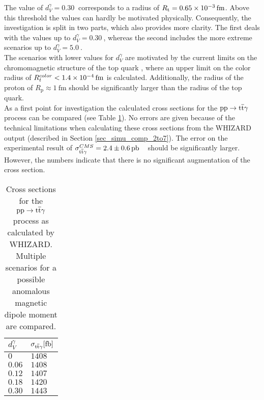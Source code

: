 The value of $d_V^{\gamma} = \SI{0.30}{}$ corresponds to a radius of $R_{\mathrm{t}} = \SI{0.65d-3}{\femto \meter}$. Above this threshold the values can hardly be motivated physically. Consequently, the investigation is split in two parts, which also provides more clarity. The first deals with the values up to $d_V^{\gamma} = \SI{0.30}{}$, whereas the second includes the more extreme scenarios up to $d_V^{\gamma} = \SI{5.0}{}$. \\
The scenarios with lower values for $d_V^{\gamma}$ are motivated by the current limits on the chromomagnetic structure of the top quark \cite{Englert:2012by}, where an upper limit on the color radius of $R_t^{color} < \SI{1.4d-4}{\femto \meter}$ is calculated. Additionally, the radius of the proton of $R_{\mathrm{p}} \approx \SI{1}{\femto \meter}$ should be significantly larger than the radius of the top quark. \\
As a first point for investigation the calculated cross sections for the $\mathrm{pp} \to \mathrm{t}\overline{\mathrm{t}} \gamma $ process can be compared (see Table \ref{tab_ano_crosssec}). No errors are given because of the technical limitations when calculating these cross sections from the WHIZARD output (described in Section \ref{sec_simu_comp_2to7}). The error on the experimental result of $\sigma^{CMS}_{\ttgamma} = \SI{2.4 \pm 0.6}{\pico \barn}$ ~\cite{CMS-PAS-TOP-13-011} should be significantly larger. However, the numbers indicate that there is no significant augmentation of the cross section. 

\begin{table}[ht]
\centering
    \caption{Cross sections for the $\mathrm{pp} \to \mathrm{t}\overline{\mathrm{t}} \gamma$ process as calculated by WHIZARD. Multiple scenarios for a possible anomalous magnetic dipole moment are compared.}
    \begin{tabular}{| l | l |}

    \hline
    $d_{V}^{\gamma}$ & $\sigma_{\ttgamma} [\SI{}{\femto \barn}]$ \\
    \hline
    $0$ &  $1408$\\
    \hline
    $0.06$ & $1408 $ \\
    \hline
    $0.12$ & $1407 $ \\
    \hline
    $0.18$ & $1420 $ \\
    \hline
    $0.30$ &  $1443 $\\
    \hline
    \end{tabular}
     \label{tab_ano_crosssec}
\end{table}

